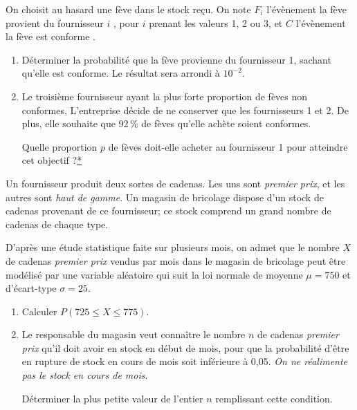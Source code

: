 \documentclass[12pt,frenchb]{article}
\begin{document}
\begin{question}[subtitle={Amérique du Nord 2015}]
On choisit au hasard une fève dans le stock reçu. On note $F_i$ l'évènement \og la fève provient du fournisseur $i$ \fg, pour $i$ prenant les valeurs 1, 2 ou 3, et $C$ l'évènement \og la fève est conforme \fg. 

\medskip

\begin{enumerate}
\item Déterminer la probabilité que la fève provienne du fournisseur 1, sachant qu'elle est conforme. Le résultat sera arrondi à $10^{-2}$. 
\item Le troisième fournisseur ayant la plus forte proportion de fèves non conformes, L’entreprise décide de ne conserver que les fournisseurs 1 et 2. De plus, elle souhaite que 92\,\% de fèves qu'elle achète soient conformes. 

Quelle proportion $p$ de fèves doit-elle acheter au fournisseur 1 pour atteindre cet objectif ?\hyperlink{Index}{*} 
\end{enumerate}

\end{question}

\begin{question}[subtitle={Centres étrangers 2015}]
Un fournisseur produit deux sortes de cadenas. Les uns sont \emph{premier prix}, et les autres sont \emph{haut de gamme}. Un magasin de bricolage dispose d'un stock de cadenas provenant de ce fournisseur; ce
stock comprend un grand nombre de cadenas de chaque type.

D'après une étude statistique faite sur plusieurs mois, on admet que le nombre $X$ de cadenas
\emph{premier prix} vendus par mois dans le magasin de bricolage peut être modélisé par une variable aléatoire qui suit la loi normale de moyenne $\mu = 750$ et d'écart-type $\sigma = 25$.

\medskip

\begin{enumerate}
\item Calculer $P(725 \leqslant  X \leqslant 775)$.
\item Le responsable du magasin veut connaître le nombre $n$ de cadenas \emph{premier prix} qu'il doit avoir en stock en début de mois, pour que la probabilité d'être en rupture de stock en cours de mois soit inférieure à 0,05. \emph{On ne réalimente pas le stock en cours de mois}.

\medskip

Déterminer la plus petite valeur de l'entier $n$ remplissant cette condition.
\end{enumerate}

\end{question}
\end{document}
